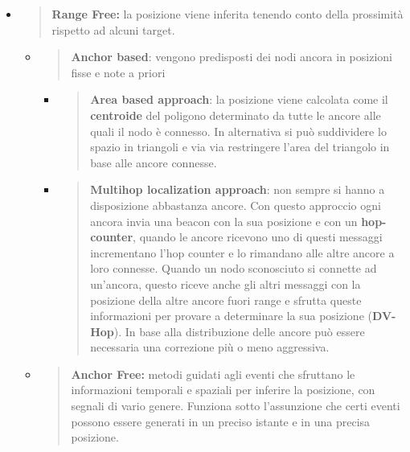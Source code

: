 \begin{itemize}
\item
  \begin{quote}
  \textbf{Range Free:} la posizione viene inferita tenendo conto della
  prossimità rispetto ad alcuni target.
  \end{quote}

  \begin{itemize}
  \item
    \begin{quote}
    \textbf{Anchor based}: vengono predisposti dei nodi ancora in
    posizioni fisse e note a priori
    \end{quote}

    \begin{itemize}
    \item
      \begin{quote}
      \textbf{Area based approach}: la posizione viene calcolata come il
      \textbf{centroide} del poligono determinato da tutte le ancore
      alle quali il nodo è connesso. In alternativa si può suddividere
      lo spazio in triangoli e via via restringere l'area del triangolo
      in base alle ancore connesse.
      \end{quote}
    \item
      \begin{quote}
      \textbf{Multihop localization approach}: non sempre si hanno a
      disposizione abbastanza ancore. Con questo approccio ogni ancora
      invia una beacon con la sua posizione e con un
      \textbf{hop-counter}, quando le ancore ricevono uno di questi
      messaggi incrementano l'hop counter e lo rimandano alle altre
      ancore a loro connesse. Quando un nodo sconosciuto si connette ad
      un'ancora, questo riceve anche gli altri messaggi con la posizione
      della altre ancore fuori range e sfrutta queste informazioni per
      provare a determinare la sua posizione (\textbf{DV-Hop}). In base
      alla distribuzione delle ancore può essere necessaria una
      correzione più o meno aggressiva.
      \end{quote}
    \end{itemize}
  \item
    \begin{quote}
    \textbf{Anchor Free:} metodi guidati agli eventi che sfruttano le
    informazioni temporali e spaziali per inferire la posizione, con
    segnali di vario genere. Funziona sotto l'assunzione che certi
    eventi possono essere generati in un preciso istante e in una
    precisa posizione.
    \end{quote}


\end{itemize}
\end{itemize}
